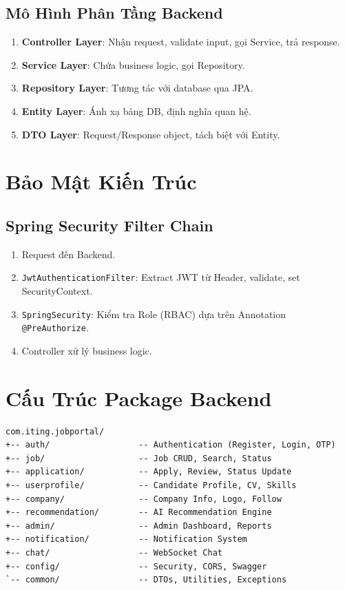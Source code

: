 \documentclass[12pt, a4paper]{report}
\begin{document}
\subsection{Mô Hình Phân Tầng Backend}

\begin{enumerate}
    \item \textbf{Controller Layer}: Nhận request, validate input, gọi Service, trả response.
    \item \textbf{Service Layer}: Chứa business logic, gọi Repository.
    \item \textbf{Repository Layer}: Tương tác với database qua JPA.
    \item \textbf{Entity Layer}: Ánh xạ bảng DB, định nghĩa quan hệ.
    \item \textbf{DTO Layer}: Request/Response object, tách biệt với Entity.
\end{enumerate}

\section{Bảo Mật Kiến Trúc}

\subsection{Spring Security Filter Chain}

\begin{enumerate}
    \item Request đến Backend.
    \item \texttt{JwtAuthenticationFilter}: Extract JWT từ Header, validate, set SecurityContext.
    \item \texttt{SpringSecurity}: Kiểm tra Role (RBAC) dựa trên Annotation \texttt{@PreAuthorize}.
    \item Controller xử lý business logic.
\end{enumerate}

\section{Cấu Trúc Package Backend}

\begin{lstlisting}[style=javastyle]
com.iting.jobportal/
+-- auth/                  -- Authentication (Register, Login, OTP)
+-- job/                   -- Job CRUD, Search, Status
+-- application/           -- Apply, Review, Status Update
+-- userprofile/           -- Candidate Profile, CV, Skills
+-- company/               -- Company Info, Logo, Follow
+-- recommendation/        -- AI Recommendation Engine
+-- admin/                 -- Admin Dashboard, Reports
+-- notification/          -- Notification System
+-- chat/                  -- WebSocket Chat
+-- config/                -- Security, CORS, Swagger
`-- common/                -- DTOs, Utilities, Exceptions
\end{lstlisting}
\end{document}
